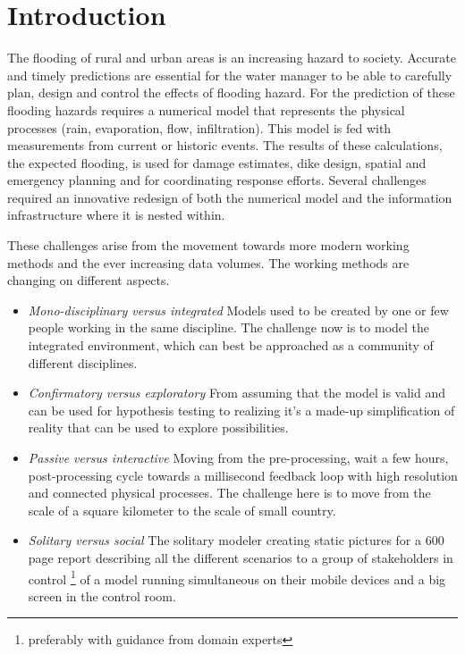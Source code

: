 \documentclass[a4paper]{article}
\begin{document}
\section{Introduction}
The flooding of rural and urban areas is an increasing hazard to society. Accurate and timely predictions are essential for the water manager to be able to carefully plan, design and control the effects of flooding hazard.
For the prediction of these flooding hazards requires a numerical model that represents the physical processes (rain, evaporation, flow, infiltration). This model is fed with measurements from current or historic events. The results of these calculations, the expected flooding, is used for damage estimates, dike design, spatial and emergency planning and for coordinating response efforts. Several challenges required an innovative redesign of both the numerical model and the information infrastructure where it is nested within.

These challenges arise from the movement towards more modern working methods and the ever increasing data volumes. The working methods are changing on different aspects.
\begin{itemize}
\item \emph{Mono-disciplinary versus integrated} Models used to be created by one or few people working in the same discipline. The challenge now is to model the integrated environment, which can best be approached as a community \citep{Voinov2010} of different disciplines.
\item \emph{Confirmatory versus exploratory} From assuming that the model is valid and can be used for hypothesis testing to realizing it's a made-up simplification of reality \citep{Oreskes1994} that can be used to explore possibilities.
\item \emph{Passive versus interactive} Moving from the pre-processing, wait a few hours, post-processing cycle towards a millisecond feedback loop with high resolution and connected physical processes. The challenge here is to move from the scale of a square kilometer \citep[for example][]{Losasso2008} to the scale of small country.
\item \emph{Solitary versus social} The solitary modeler creating static pictures for a 600 page report describing all the different scenarios to a group of stakeholders in control \footnote{preferably with guidance from domain experts} of a model running simultaneous on their mobile devices and a big screen in the control room.
\end{itemize}
\end{document}

